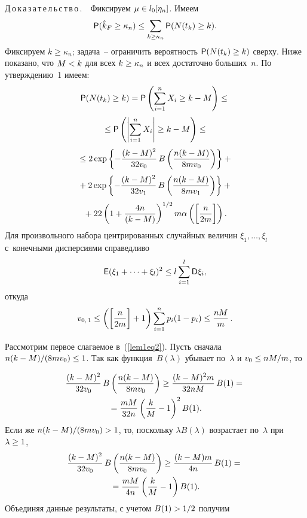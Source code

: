 \begin{multicols}{2}
\noindent
Д\,о\,к\,а\,з\,а\,т\,е\,л\,ь\,с\,т\,в\,о\,.\ \ Фиксируем $\mu\hm\in l_0[\eta_n]$. Имеем
\begin{equation}
\label{lem1eq1}
\p(\hat{k}_F\geq \kappa_n) \leq \sum\limits_{k\geq\kappa_n} \p(N(t_k)\geq k).
\end{equation}
Фиксируем $k \geq \kappa_n$; задача~-- ограничить вероятность $\p(N(t_k)\hm\geq k)$ 
сверху. Ниже показано, что $M\hm<k$ для всех $k \hm\geq \kappa_n$ и всех достаточно 
больших~$n$. По утверждению~1 имеем:
\begin{multline}
\p(N(t_k)\geq k) = \p\left(\sum\limits_{i=1}^n X_i \geq k-M\right) \leq {}\\[3pt]
{}\leq
\p\left(\left|\sum\limits_{i=1}^n X_i \right| \geq k-M\right) \leq{}\\[3pt]
{}\leq 2 \exp\left\{-\fr{(k-M)^2}{32 v_0}\, B\left(\fr{n(k-M)}{8m  v_0}\right)\right\}+{}\\[3pt]
{}+2 \exp\left\{-\fr{(k-M)^2}{32 v_1}\, B\left(
\fr{n(k-M)}{8m v_1}\right)\right\} +{}\\[3pt]
{}+ 22\left(1+\fr{4n}{(k-M)}\right)^{1/2} m  \alpha\left(\left[\fr{n}{2m}\right]\right).
\label{lem1eq2}
\end{multline}
Для произвольного набора центрированных случайных величин $\xi_1, \ldots, \xi_l$ 
с~конечными дисперсиями справедливо
$$
{\sf E}(\xi_1 + \cdots + \xi_l)^2 \leq l\sum\limits_{i=1}^l {\sf D} \xi_i,
$$
откуда
$$
v_{0,\,1} \leq \left(\left[\displaystyle\frac{\displaystyle n\mathstrut}{\displaystyle 2m\mathstrut}\right]+1\right) \sum\limits_{i=1}^n  p_i(1-p_i) \leq \displaystyle\frac{\displaystyle nM\mathstrut}{\displaystyle m\mathstrut}\,.
$$

Рассмотрим первое слагаемое в~(\ref{lem1eq2}). Пусть сначала $n(k-M)/(8mv_0) 
\hm\leq 1$. Так как функция~$B(\lambda)$ убывает по~$\lambda$ и $v_0 \hm\leq nM/m$, то

\noindent
\begin{multline*}
\displaystyle\frac{\displaystyle (k-M)^2\mathstrut}{\displaystyle 32 v_0\mathstrut}\, B\left(\displaystyle\frac{\displaystyle n(k-M)\mathstrut}{\displaystyle 8m v_0\mathstrut}\right) \geq \displaystyle\frac{\displaystyle (k-M)^2 m\mathstrut}{\displaystyle 32nM\mathstrut}\, B(1) ={}\\
{}=
\displaystyle\frac{\displaystyle mM\mathstrut}{\displaystyle 32n\mathstrut} \left(\displaystyle\frac{\displaystyle k\mathstrut}{\displaystyle M\mathstrut}-1\right)^2 B(1).
\end{multline*}
Если же $n(k-M)/(8mv_0)\hm > 1$, то, поскольку $\lambda B(\lambda)$ возрастает по~$\lambda$ при $\lambda\hm\geq1$,
\begin{multline*}
\displaystyle\frac{\displaystyle (k-M)^2\mathstrut}{\displaystyle 32 v_0\mathstrut}\, B\left(\displaystyle\frac{\displaystyle n(k-M)\mathstrut}{\displaystyle 8m v_0\mathstrut}\right) \geq  \displaystyle\frac{\displaystyle (k-M) m\mathstrut}{\displaystyle 4n\mathstrut}\, B(1) ={}\\
{}=  \displaystyle\frac{\displaystyle mM\mathstrut}{\displaystyle 4n\mathstrut} \left(\displaystyle\frac{\displaystyle k\mathstrut}{\displaystyle M\mathstrut}-1\right) B(1).
\end{multline*}
Объединяя данные результаты, с учетом $B(1)\hm>1/2$ получим


\end{multicols}
